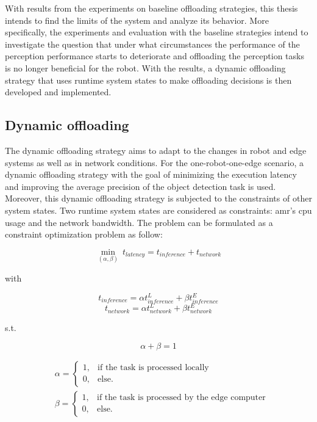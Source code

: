 With results from the experiments on baseline offloading strategies, this thesis intends to find the limits of the system and analyze its behavior. More specifically, the experiments and evaluation with the baseline strategies intend to investigate the question that under what circumstances the performance of the perception performance starts to deteriorate and offloading the perception tasks is no longer beneficial for the robot. With the results, a dynamic offloading strategy that uses runtime system states to make offloading decisions is then developed and implemented. 

\subsection{Dynamic offloading}

The dynamic offloading strategy aims to adapt to the changes in robot and edge systems as well as in network conditions. For the one-robot-one-edge scenario, a dynamic offloading strategy with the goal of minimizing the execution latency and improving the average precision of the object detection task is used. Moreover, this dynamic offloading strategy is subjected to the constraints of other system states. Two runtime system states are considered as constraints: \gls{amr}'s \gls{cpu} usage and the network bandwidth. The problem can be formulated as a constraint optimization problem as follow:

\begin{equation}\label{eqn:execution_latency}
    \min_{(\alpha, \beta)} \: t_{latency} = t_{inference} + t_{network}
\end{equation}

with

\begin{equation*}
    t_{inference} = \alpha t_{inference}^{L} + \beta t_{inference}^{E}
\end{equation*}
\begin{equation*}
    t_{network} = \alpha t_{network}^{L} + \beta t_{network}^{E}
\end{equation*}

s.t.

\begin{equation*}
    \alpha + \beta = 1
\end{equation*}

\begin{align*}
    & \alpha = \begin{cases}
        1, & \text{if the task is processed locally} \\
        0, & \text{else.}
    \end{cases} \\
    & \beta = \begin{cases}
        1, & \text{if the task is processed by the edge computer} \\
        0, & \text{else.}
    \end{cases}
\end{align*}

